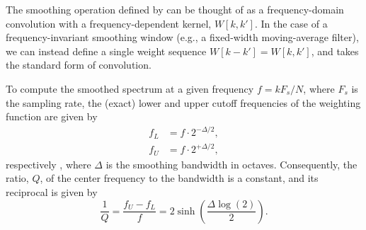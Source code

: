 The smoothing operation defined by  can be thought of as a frequency-domain convolution with a frequency-dependent kernel, $W[k, k']$.
In the case of a frequency-invariant smoothing window (e.g., a fixed-width moving-average filter), we can instead define a single weight sequence $W[k - k'] = W[k, k']$, and  takes the standard form of convolution.

To compute the smoothed spectrum at a given frequency $f = k F_s / N$, where $F_s$ is the sampling rate, the (exact) lower and upper cutoff frequencies of the weighting function are given by
\begin{equation}\label{eq:A3_Smoothing_Weights:cutoffs}
    \begin{array}{ll}
    f_L &= f \cdot 2^{-\Delta/2},\\[8pt]
    f_U &= f \cdot 2^{+\Delta/2},
    \end{array}
\end{equation}
respectively \citep{HatziantoniouMourjopoulos2000}, where $\Delta$ is the smoothing bandwidth in octaves.
Consequently, the ratio, $Q$, of the center frequency to the bandwidth is a constant, and its reciprocal is given by
\begin{equation}\label{eq:A3_Smoothing_Weights:QFactor}
\frac{1}{Q} = \frac{f_U-f_L}{f} = 2 \sinh \left( \frac{\Delta \log (2)}{2} \right).
\end{equation}


